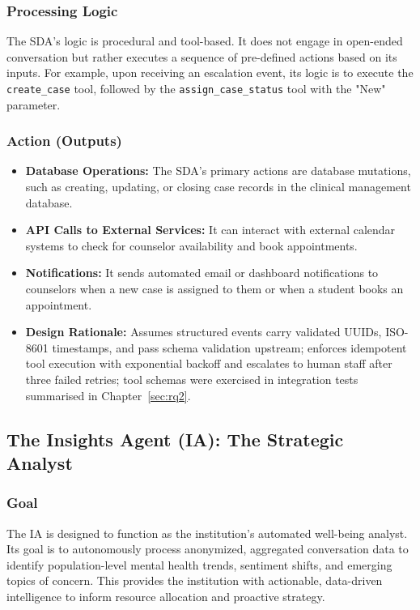 \subsubsection{Processing Logic}
The SDA's logic is procedural and tool-based. It does not engage in open-ended conversation but rather executes a sequence of pre-defined actions based on its inputs. For example, upon receiving an escalation event, its logic is to execute the \texttt{create\_case} tool, followed by the \texttt{assign\_case\_status} tool with the "New" parameter.

\subsubsection{Action (Outputs)}
\begin{itemize}
    \item \textbf{Database Operations:} The SDA's primary actions are database mutations, such as creating, updating, or closing case records in the clinical management database.
    \item \textbf{API Calls to External Services:} It can interact with external calendar systems to check for counselor availability and book appointments.
    \item \textbf{Notifications:} It sends automated email or dashboard notifications to counselors when a new case is assigned to them or when a student books an appointment.
\end{itemize}

\begin{itemize}
    \item \textbf{Design Rationale:} Assumes structured events carry validated UUIDs, ISO-8601 timestamps, and pass schema validation upstream; enforces idempotent tool execution with exponential backoff and escalates to human staff after three failed retries; tool schemas were exercised in integration tests summarised in Chapter~\ref{sec:rq2}.\cite{FIND_CITATION_PLACEHOLDER}
\end{itemize}

\subsection{The Insights Agent (IA): The Strategic Analyst}

\subsubsection{Goal}
The IA is designed to function as the institution's automated well-being analyst. Its goal is to autonomously process anonymized, aggregated conversation data to identify population-level mental health trends, sentiment shifts, and emerging topics of concern. This provides the institution with actionable, data-driven intelligence to inform resource allocation and proactive strategy.

